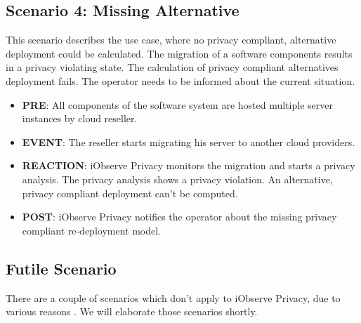 \subsection{Scenario 4: Missing Alternative}
\label{eval:scenario:4}
This scenario describes the use case, where no privacy compliant, alternative deployment could be calculated. The migration of a software components results in a privacy violating state. The calculation of privacy compliant alternatives deployment fails. The operator needs to be informed about the current situation.
\begin{itemize}
	\setlength\itemsep{0em}
	\item \textbf{PRE}: All components of the software system are hosted multiple server instances by cloud reseller. 
	\item \textbf{EVENT}: The reseller starts migrating his server to another cloud providers.
	\item \textbf{REACTION}: iObserve Privacy monitors the migration and starts a privacy analysis. The privacy analysis shows a privacy violation. An alternative, privacy compliant deployment can't be computed.
	\item \textbf{POST}: iObserve Privacy notifies the operator about the missing privacy compliant re-deployment model.
\end{itemize}


\subsection{Futile Scenario}
There are a couple of scenarios which don't apply to iObserve Privacy, due to various reasons \cite{Heinrich.2016b}. We will elaborate those scenarios shortly.

